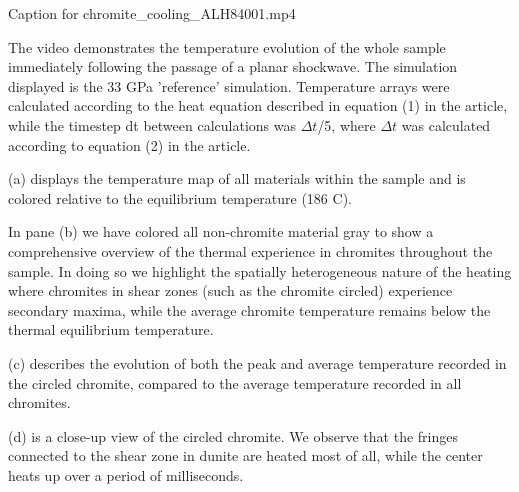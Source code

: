 Caption for chromite_cooling_ALH84001.mp4

The video demonstrates the temperature evolution of the whole sample immediately following the passage of a planar shockwave. 
The simulation displayed is the 33 GPa 'reference' simulation. Temperature arrays were calculated according to the heat equation
described in equation (1) in the article, while the timestep dt between calculations was $\Delta t$/5, where $\Delta t$ was calculated
according to equation (2) in the article.

(a) displays the temperature map of all materials within the sample and is colored relative to the equilibrium temperature (186 C).

In pane (b) we have colored all non-chromite material gray to show a comprehensive overview of the thermal experience in chromites 
throughout the sample. In doing so we highlight the spatially heterogeneous nature of the heating where chromites in shear zones 
(such as the chromite circled) experience secondary maxima, while the average chromite temperature remains below the thermal equilibrium
temperature.

(c) describes the evolution of both the peak and average temperature recorded in the circled chromite, compared to the average temperature 
recorded in all chromites.

(d) is a close-up view of the circled chromite. We observe that the fringes connected to the shear zone in dunite are heated most of all,
while the center heats up over a period of milliseconds. 
